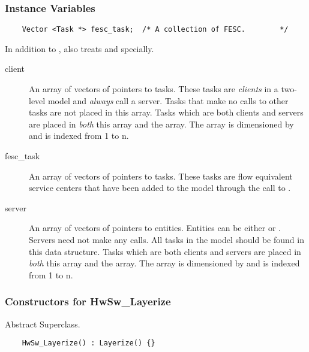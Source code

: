 \subsubsection{Instance Variables}
\begin{verbatim}
    Vector <Task *> fesc_task;  /* A collection of FESC.        */
\end{verbatim}

In addition to ,  also
treats  and  specially.

\begin{description}
\item[client] \texonly{---} An array of vectors of pointers to tasks.
  These tasks are \emph{clients} in a two-level model and
  \emph{always} call a server.  Tasks that make no calls to other
  tasks are not placed in this array.  Tasks which are both clients
  and servers are placed in \emph{both} this array and the
   array.  The array is dimensioned by  and
  is indexed from 1 to n.
\item[fesc_task] \texonly{---} An array of vectors of pointers to
  tasks.  These tasks are flow equivalent service centers that have
  been added to the model through the call to .
\item[server] \texonly{---} An array of vectors of pointers to
  entities.  Entities can be either  or
  .  Servers need not make any calls.
  All tasks in the model should be found in this data structure.
  Tasks which are both clients and servers are placed in \emph{both}
  this array and the  array.  The array is dimensioned by
   and is indexed from 1 to n.
\end{description}

\subsubsection{Constructors for HwSw_Layerize}

Abstract Superclass.

\begin{verbatim}
    HwSw_Layerize() : Layerize() {}
\end{verbatim}

